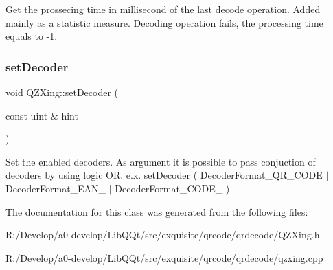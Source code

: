 Get the prossecing time in millisecond of the last decode operation. Added mainly as a statistic measure. Decoding operation fails, the processing time equals to -\/1. \mbox{\label{class_q_z_xing_ab8292973f0e6820b763dd5bc0fd3060e}} 
\subsubsection{\texorpdfstring{set\+Decoder}{setDecoder}}
{\footnotesize\ttfamily void Q\+Z\+Xing\+::set\+Decoder (\begin{DoxyParamCaption}\item[{const uint \&}]{hint }\end{DoxyParamCaption})\hspace{0.3cm}{\ttfamily [slot]}}

Set the enabled decoders. As argument it is possible to pass conjuction of decoders by using logic OR. e.\+x. set\+Decoder ( Decoder\+Format\+\_\+\+Q\+R\+\_\+\+C\+O\+DE $\vert$ Decoder\+Format\+\_\+\+E\+A\+N\+\_ $\vert$ Decoder\+Format\+\_\+\+C\+O\+D\+E\+\_ ) 

The documentation for this class was generated from the following files\+:\begin{DoxyCompactItemize}
\item 
R\+:/\+Develop/a0-\/develop/\+Lib\+Q\+Qt/src/exquisite/qrcode/qrdecode/Q\+Z\+Xing.\+h\item 
R\+:/\+Develop/a0-\/develop/\+Lib\+Q\+Qt/src/exquisite/qrcode/qrdecode/qzxing.\+cpp\end{DoxyCompactItemize}
